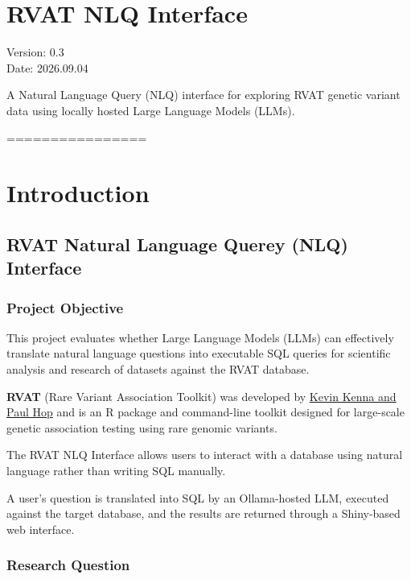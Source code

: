 \documentclass[
]{article}
\author{}
\date{\vspace{-2.5em}}
\begin{document}
\section{RVAT NLQ Interface}\label{rvat-nlq-interface}

Version: 0.3\\
Date: 2026.09.04

A Natural Language Query (NLQ) interface for exploring RVAT genetic
variant data using locally hosted Large Language Models (LLMs).

================

\section{Introduction}\label{introduction}

\subsection{RVAT Natural Language Querey (NLQ)
Interface}\label{rvat-natural-language-querey-nlq-interface}

\subsubsection{Project Objective}\label{project-objective}

This project evaluates whether Large Language Models (LLMs) can
effectively translate natural language questions into executable SQL
queries for scientific analysis and research of datasets against the
RVAT database.

\textbf{RVAT} (Rare Variant Association Toolkit) was developed by
\href{https://kennalab.github.io/rvat/articles/basics.html}{Kevin Kenna
and Paul Hop} and is an R package and command-line toolkit designed for
large-scale genetic association testing using rare genomic variants.

The RVAT NLQ Interface allows users to interact with a database using
natural language rather than writing SQL manually.

A user's question is translated into SQL by an Ollama-hosted LLM,
executed against the target database, and the results are returned
through a Shiny-based web interface.

\subsubsection{Research Question}\label{research-question}
\end{document}
